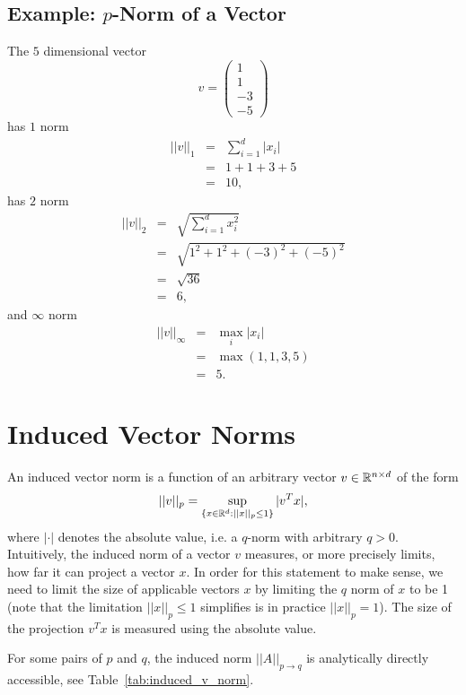 \documentclass{article}
\begin{document}
\subsection{Example: $p$-Norm of a Vector}
The $5$ dimensional vector 
$$v = 
\begin{pmatrix}
1 \\ 1 \\ -3 \\ -5
\end{pmatrix}
$$
has $1$ norm
\begin{eqnarray*}
||v||_1 &=& \sum_{i = 1}^d |x_i| \\
&=& 1 + 1 + 3 + 5 \\
&=& 10,
\end{eqnarray*}
has $2$ norm
\begin{eqnarray*}
||v||_2 &=& \sqrt{\sum_{i = 1}^d x_i^2} \\
&=& \sqrt{1^2 + 1^2 + (-3)^2 + (-5)^2} \\
&=& \sqrt{36} \\
&=& 6,
\end{eqnarray*}
and $\infty$ norm
\begin{eqnarray*}
||v||_\infty &=& \max_i |x_i| \\
&=& \max(1, 1, 3, 5) \\
&=& 5.
\end{eqnarray*}

\section{Induced Vector Norms}
An induced vector norm is a function of an arbitrary vector $v \in \mathbb{R}^{n \times d}$ of the form
$$||v||_{p} = \sup_{\{x \in \mathbb{R}^d: ||x||_p \leq 1\}} |v^T x|,$$
where $|\cdot|$ denotes the absolute value, i.e. a $q$-norm with arbitrary $q > 0$.
Intuitively, the induced norm of a vector $v$ measures, or more precisely limits, how far it can project a vector $x$.
In order for this statement to make sense, we need to limit the size of applicable vectors $x$ by limiting the $q$ norm of $x$ to be 1 (note that the limitation $||x||_p \leq 1$ simplifies is in practice $||x||_p = 1$). 
The size of the projection $v^Tx$ is measured using the absolute value.

For some pairs of $p$ and $q$, the induced norm $||A||_{p \to q}$ is analytically directly accessible, see Table~\ref{tab:induced_v_norm}. 
\end{document}
